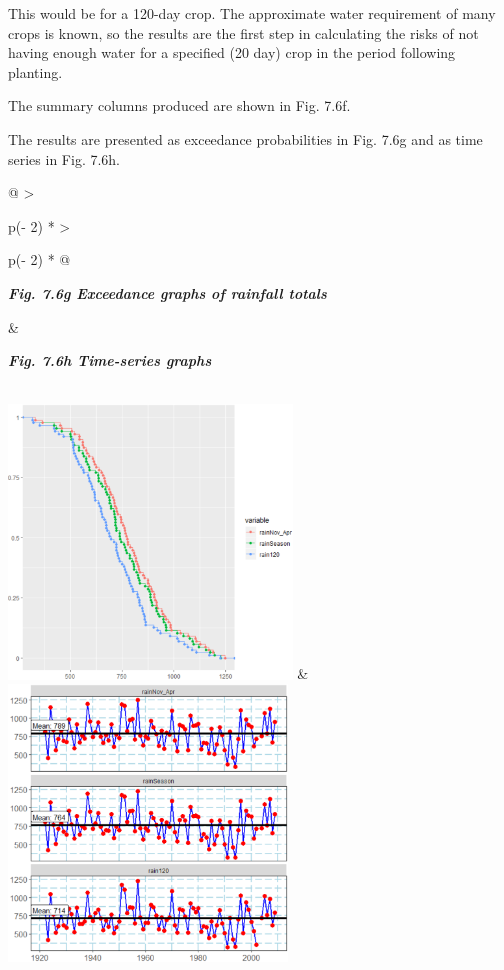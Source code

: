 \documentclass[
  letterpaper,
  DIV=11,
  numbers=noendperiod]{scrreprt}
\begin{document}
This would be for a 120-day crop. The approximate water requirement of
many crops is known, so the results are the first step in calculating
the risks of not having enough water for a specified (20 day) crop in
the period following planting.

The summary columns produced are shown in Fig. 7.6f.

The results are presented as exceedance probabilities in Fig. 7.6g and
as time series in Fig. 7.6h.

\begin{longtable}[]{@{}
  >{\raggedright\arraybackslash}p{(\columnwidth - 2\tabcolsep) * }
  >{\raggedright\arraybackslash}p{(\columnwidth - 2\tabcolsep) * }@{}}
\toprule\noalign{}
\begin{minipage}[b]{\linewidth}\raggedright
\textbf{\emph{Fig. 7.6g Exceedance graphs of rainfall totals}}
\end{minipage} & \begin{minipage}[b]{\linewidth}\raggedright
\textbf{\emph{Fig. 7.6h Time-series graphs}}
\end{minipage} \\
\midrule\noalign{}
\endhead
\bottomrule\noalign{}
\endlastfoot
\includegraphics[width=2.96572in,height=2.8693in]{figures/Fig7.6g.png} &
\includegraphics[width=2.9133in,height=2.893in]{figures/Fig7.6h.png} \\
\end{longtable}
\end{document}
